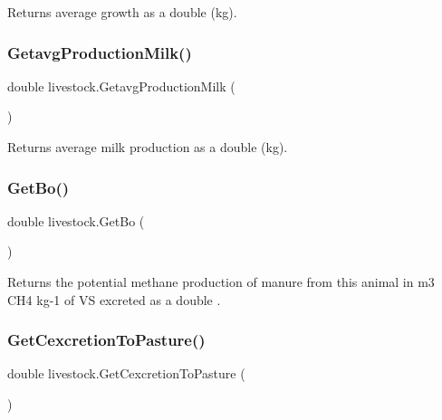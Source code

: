 Returns average growth as a double (kg). 

\mbox{\label{classlivestock_a1651811606edb2bb4e9687b404aa573b}} 
\subsubsection{\texorpdfstring{GetavgProductionMilk()}{GetavgProductionMilk()}}
{\footnotesize\ttfamily double livestock.\+Getavg\+Production\+Milk (\begin{DoxyParamCaption}{ }\end{DoxyParamCaption})\hspace{0.3cm}{\ttfamily [inline]}}



Returns average milk production as a double (kg). 

\mbox{\label{classlivestock_a9744aa8fa110c1b3625f100e3621f8d0}} 
\subsubsection{\texorpdfstring{GetBo()}{GetBo()}}
{\footnotesize\ttfamily double livestock.\+Get\+Bo (\begin{DoxyParamCaption}{ }\end{DoxyParamCaption})\hspace{0.3cm}{\ttfamily [inline]}}



Returns the potential methane production of manure from this animal in m3 C\+H4 kg-\/1 of VS excreted as a double . 

\mbox{\label{classlivestock_aca22e216df3954148d343e3a552a3497}} 
\subsubsection{\texorpdfstring{GetCexcretionToPasture()}{GetCexcretionToPasture()}}
{\footnotesize\ttfamily double livestock.\+Get\+Cexcretion\+To\+Pasture (\begin{DoxyParamCaption}{ }\end{DoxyParamCaption})\hspace{0.3cm}{\ttfamily [inline]}}



